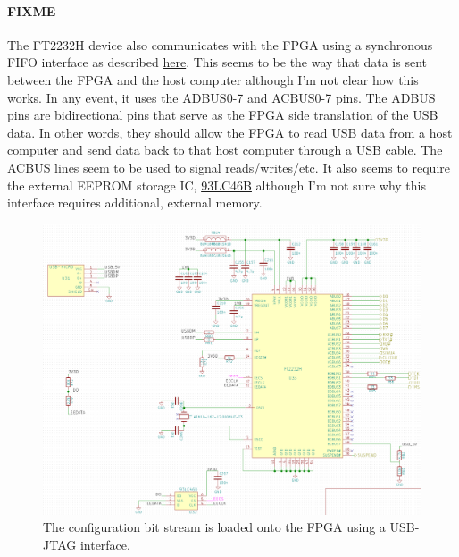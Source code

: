 \paragraph{FIXME} The FT2232H device also communicates with the FPGA using a synchronous FIFO
interface as described
\href{http://www.ftdichip.com/Support/Documents/AppNotes/AN_130_FT2232H_Used_In_FT245\%20Synchronous\%20FIFO\%20Mode.pdf}{here}. This
seems to be the way that data is sent between the FPGA and the host computer although I'm not
clear how this works. In any event, it uses the ADBUS0-7 and ACBUS0-7 pins. The ADBUS pins
are bidirectional pins that serve as the FPGA side translation of the USB data. In other words,
they should allow the FPGA to read USB data from a host computer and send data back to that host
computer through a USB cable. The ACBUS lines seem to be used to signal reads/writes/etc. It also
seems to require the external EEPROM storage IC,
\href{http://ww1.microchip.com/downloads/en/DeviceDoc/20001749K.pdf}{93LC46B} although I'm not sure
why this interface requires additional, external memory.

\begin{figure}[h]
  \centering
  \includegraphics[width=\textwidth]{data/usb-ft2232.png}
  \caption{The configuration bit stream is loaded onto the FPGA using a USB-JTAG interface.}
  \label{fig:usb_ft2232}
\end{figure}